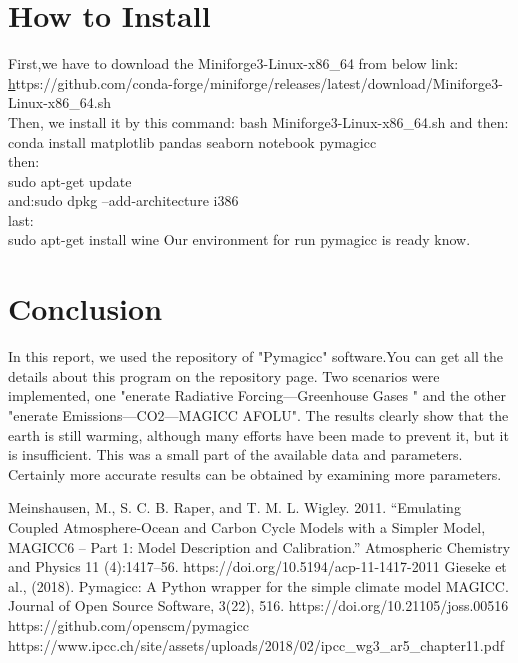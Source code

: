 \documentclass{article}
\begin{document}
\section{How to Install}
First,we have to download the Miniforge3-Linux-x86\_64 from below link:\\

\href{https://github.com/conda-forge/miniforge/releases/latest/download/Miniforge3-Linux-x86_64.sh}https://github.com/conda-forge/miniforge/releases/latest/download/Miniforge3-Linux-x86\_64.sh\\

Then, we install it by this command: 
bash Miniforge3-Linux-x86\_64.sh  and then:\\

conda install matplotlib pandas seaborn notebook pymagicc\\

then:\\

sudo apt-get update \\

and:sudo dpkg --add-architecture i386\\

 last:\\
 sudo apt-get install wine
 Our environment for run pymagicc is ready know.\\
\vspace{1cm} 
\section{Conclusion}
In this report, we used the repository of "Pymagicc" software\cite{3}.You can get all the details about this program on the repository page. Two scenarios were implemented, one "enerate Radiative Forcing—Greenhouse Gases " and the other "enerate Emissions—CO2—MAGICC AFOLU". The results clearly show that the earth is still warming, although many efforts have been made to prevent it, but it is insufficient. This was a small part of the available data and parameters. Certainly more accurate results can be obtained by examining more parameters.

\vspace{1cm} 
\begin{thebibliography}{9}
Meinshausen, M., S. C. B. Raper, and T. M. L. Wigley. 2011. “Emulating Coupled
Atmosphere-Ocean and Carbon Cycle Models with a Simpler Model, MAGICC6 – Part 1:
Model Description and Calibration.” Atmospheric Chemistry and Physics 11 (4):1417–56.
https://doi.org/10.5194/acp-11-1417-2011
Gieseke et al., (2018). Pymagicc: A Python wrapper for the simple climate model MAGICC. Journal of Open Source Software, 3(22), 516.
https://doi.org/10.21105/joss.00516
https://github.com/openscm/pymagicc
https://www.ipcc.ch/site/assets/uploads/2018/02/ipcc_wg3_ar5_chapter11.pdf
\end{thebibliography}
\end{document}
